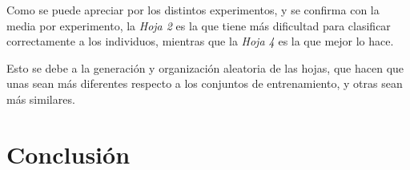 \documentclass{uc3mpracticas}
\begin{document}
Como se puede apreciar por los distintos experimentos, y se confirma con la media por experimento, la \textit{Hoja 2} es la que tiene más dificultad para clasificar correctamente a los individuos, mientras que la \textit{Hoja 4} es la que mejor lo hace.

\vspace{1mm}

Esto se debe a la generación y organización aleatoria de las hojas, que hacen que unas sean más diferentes respecto a los conjuntos de entrenamiento, y otras sean más similares.



\section{Conclusión}
\end{document}
